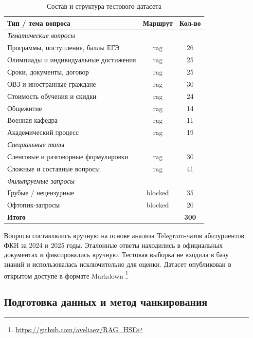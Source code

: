 \documentclass{article}
\begin{document}
\begin{table}[h]
\centering
\begin{tabular}{lcc}
\hline
\textbf{Тип / тема вопроса} & \textbf{Маршрут} & \textbf{Кол-во} \\
\hline
\multicolumn{3}{l}{\textit{Тематические вопросы}} \\
Программы, поступление, баллы ЕГЭ      & rag       & 26 \\
Олимпиады и индивидуальные достижения   & rag       & 25 \\
Сроки, документы, договор              & rag       & 25 \\
ОВЗ и иностранные граждане             & rag       & 30 \\
Стоимость обучения и скидки            & rag       & 24 \\
Общежитие                              & rag       & 14 \\
Военная кафедра                        & rag       & 11 \\
Академический процесс                  & rag       & 19 \\
\hline
\multicolumn{3}{l}{\textit{Специальные типы}} \\
Сленговые и разговорные формулировки   & rag       & 30 \\
Сложные и составные вопросы            & rag       & 41 \\
\hline
\multicolumn{3}{l}{\textit{Фильтруемые запросы}} \\
Грубые / нецензурные                   & blocked   & 35 \\
Офтопик-запросы                        & blocked   & 20 \\
\hline
\textbf{Итого}                         &           & \textbf{300} \\
\hline
\end{tabular}
\caption{Состав и структура тестового датасета}
\label{tab:dataset_categories}
\end{table}

\noindent Вопросы составлялись вручную на основе анализа Telegram-чатов абитуриентов
ФКН за 2024 и 2025 годы. Эталонные ответы находились в официальных
документах и фиксировались вручную. Тестовая выборка не входила в базу
знаний и использовалась исключительно для оценки. Датасет опубликован в открытом доступе в формате Markdown%
\footnote{\url{https://github.com/aveliaev/RAG_HSE}}


\subsection{Подготовка данных и метод чанкирования}
\end{document}
